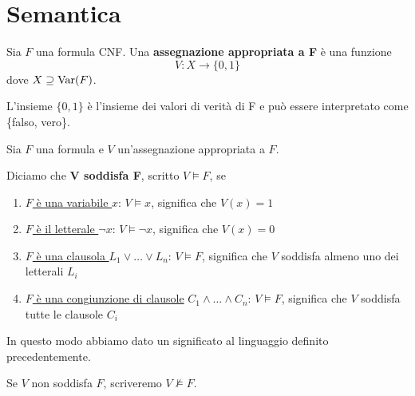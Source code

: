 \documentclass[../main.tex]{subfiles}
\begin{document}
\section{Semantica}
\begin{definition}
    Sia $F$ una formula CNF. Una \textbf{assegnazione appropriata a F} è una funzione
    \begin{equation*}
        V: X \rightarrow \{0,1\}
    \end{equation*}
    dove $X \supseteq \operatorname{Var} (F)$.
\end{definition}

L'insieme $\{0,1\}$ è l'insieme dei valori di verità di F e può essere interpretato come \{falso, vero\}.

\begin{definition}[Soddisfacibilità]
    Sia $F$ una formula e $V$ un'assegnazione appropriata a $F$.

    Diciamo che \textbf{V soddisfa F}, scritto $V \vDash F$, se
    \begin{enumerate}
        \item \underline{$F$ è una variabile $x$}: $V \vDash x$, significa che $V(x) = 1$
        \item \underline{$F$ è il letterale $\neg x$}: $V \vDash \neg x$, significa che $V(x) = 0$
        \item \underline{$F$ è una clausola $L_1 \lor \ldots \lor L_n$}: $V \vDash F$, significa che $V$ soddisfa almeno uno dei letterali $L_i$
        \item \underline{$F$ è una congiunzione di clausole} $C_1 \land \ldots \land C_n$: $V \vDash F$, significa che $V$ soddisfa tutte le clausole $C_i$
    \end{enumerate}
    In questo modo abbiamo dato un significato al linguaggio definito precedentemente.

    Se $V$ non soddisfa $F$, scriveremo $V \nvDash F$.
\end{definition}
\end{document}
